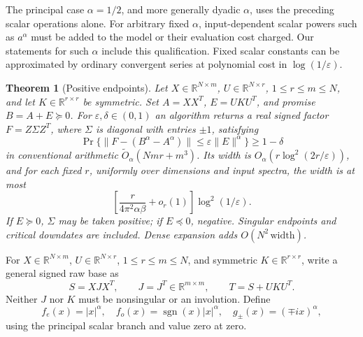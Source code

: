 \documentclass[11pt]{article}
\newtheorem{theorem}{Theorem}[section]
\numberwithin{equation}{section}
\newcommand{\R}{\mathbb R}
\newcommand{\sgn}{\operatorname{sgn}}
\begin{document}
The principal case $\alpha=1/2$, and more generally dyadic $\alpha$,
uses the preceding scalar operations alone. For arbitrary fixed
$\alpha$, input-dependent scalar powers such as $a^\alpha$ must be
added to the model or their evaluation cost charged. Our statements
for such $\alpha$ include this qualification. Fixed scalar constants
can be approximated by ordinary convergent series at polynomial cost
in $\log(1/\varepsilon)$.

\begin{theorem}[Positive endpoints]\label{thm:PSD}
Let $X\in\R^{N\times m}$, $U\in\R^{N\times r}$,
$1\le r\le m\le N$, and let $K\in\R^{r\times r}$ be symmetric.
Set $A=XX^T$, $E=UKU^T$, and promise $B=A+E\succeq0$.
For $\varepsilon,\delta\in(0,1)$ an algorithm returns a real signed
factor $F=Z\Sigma Z^T$, where $\Sigma$ is diagonal with entries
$\pm1$, satisfying
\begin{equation}\label{eq:errorPSD}
 \Pr\{\|F-(B^\alpha-A^\alpha)\|
             \le\varepsilon\|E\|^\alpha\}\ge1-\delta
\end{equation}
in conventional arithmetic $\widetilde O_\alpha(Nmr+m^3)$.
Its width is $O_\alpha(r\log^2(2r/\varepsilon))$, and for each fixed
$r$, uniformly over dimensions and input spectra, the width is at most
\begin{equation}\label{eq:PSDwidth}
 \left[\frac{r}{4\pi^2\alpha\beta}+o_r(1)\right]
                          \log^2(1/\varepsilon).
\end{equation}
If $E\succeq0$, $\Sigma$ may be taken positive; if $E\preceq0$,
negative. Singular endpoints and critical downdates are included.
Dense expansion adds $O(N^2\,\mathrm{width})$.
\end{theorem}

For $X\in\R^{N\times m}$, $U\in\R^{N\times r}$,
$1\le r\le m\le N$, and symmetric $K\in\R^{r\times r}$,
write a general signed raw base as
\begin{equation}\label{eq:rawS}
 S=XJX^T,\qquad J=J^T\in\R^{m\times m},
 \qquad T=S+UKU^T.
\end{equation}
Neither $J$ nor $K$ must be nonsingular or an involution. Define
\[
 f_e(x)=|x|^\alpha,\quad
 f_o(x)=\sgn(x)|x|^\alpha,\quad
 g_\pm(x)=(\mp ix)^\alpha,
\]
using the principal scalar branch and value zero at zero.
\end{document}
